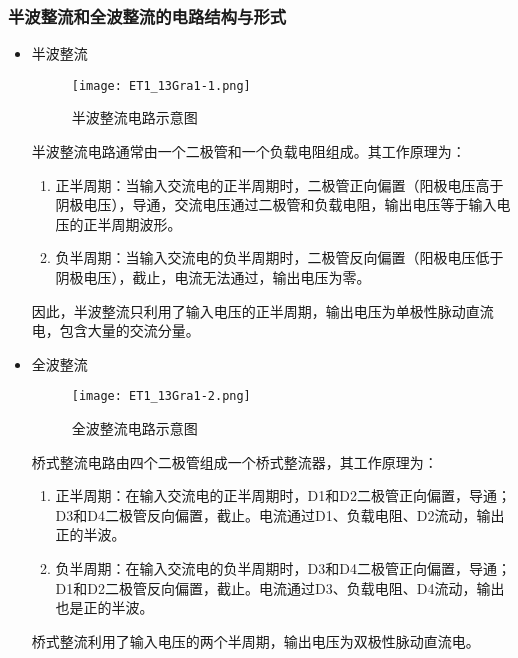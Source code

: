 \documentclass[dvipsnames, svgnames,a4paper,11pt]{article}
\begin{document}
		\subsubsection*{半波整流和全波整流的电路结构与形式}

			\begin{itemize}
				\item 半波整流
				
				\begin{figure}[htbp]
					\centering
					\texttt{[image: ET1\_13Gra1-1.png]}
					\caption{半波整流电路示意图}
					\label{fig:figP1}
				\end{figure}

				半波整流电路通常由一个二极管和一个负载电阻组成。其工作原理为：

				\begin{enumerate}
					\item 正半周期：当输入交流电的正半周期时，二极管正向偏置（阳极电压高于阴极电压），导通，交流电压通过二极管和负载电阻，输出电压等于输入电压的正半周期波形。
					\item 负半周期：当输入交流电的负半周期时，二极管反向偏置（阳极电压低于阴极电压），截止，电流无法通过，输出电压为零。
	
				\end{enumerate}
			
				因此，半波整流只利用了输入电压的正半周期，输出电压为单极性脉动直流电，包含大量的交流分量。


				\item 全波整流
				
				\begin{figure}[htbp]
					\centering
					\texttt{[image: ET1\_13Gra1-2.png]}
					\caption{全波整流电路示意图}
					\label{fig:figP1}
				\end{figure}


				桥式整流电路由四个二极管组成一个桥式整流器，其工作原理为：

				\begin{enumerate}
					\item 正半周期：在输入交流电的正半周期时，D1和D2二极管正向偏置，导通；D3和D4二极管反向偏置，截止。电流通过D1、负载电阻、D2流动，输出正的半波。
					\item 负半周期：在输入交流电的负半周期时，D3和D4二极管正向偏置，导通；D1和D2二极管反向偏置，截止。电流通过D3、负载电阻、D4流动，输出也是正的半波。
				\end{enumerate}
				
				桥式整流利用了输入电压的两个半周期，输出电压为双极性脉动直流电。
			\end{itemize}
			
\end{document}
